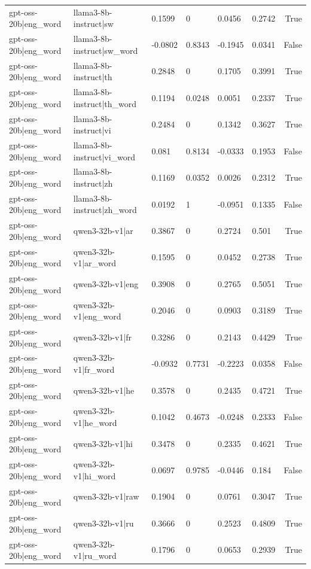 \begin{table}
\begin{tabular}{llllllr}
gpt-oss-20b|eng_word & llama3-8b-instruct|sw & 0.1599 & 0 & 0.0456 & 0.2742 & True \\
gpt-oss-20b|eng_word & llama3-8b-instruct|sw_word & -0.0802 & 0.8343 & -0.1945 & 0.0341 & False \\
gpt-oss-20b|eng_word & llama3-8b-instruct|th & 0.2848 & 0 & 0.1705 & 0.3991 & True \\
gpt-oss-20b|eng_word & llama3-8b-instruct|th_word & 0.1194 & 0.0248 & 0.0051 & 0.2337 & True \\
gpt-oss-20b|eng_word & llama3-8b-instruct|vi & 0.2484 & 0 & 0.1342 & 0.3627 & True \\
gpt-oss-20b|eng_word & llama3-8b-instruct|vi_word & 0.081 & 0.8134 & -0.0333 & 0.1953 & False \\
gpt-oss-20b|eng_word & llama3-8b-instruct|zh & 0.1169 & 0.0352 & 0.0026 & 0.2312 & True \\
gpt-oss-20b|eng_word & llama3-8b-instruct|zh_word & 0.0192 & 1 & -0.0951 & 0.1335 & False \\
gpt-oss-20b|eng_word & qwen3-32b-v1|ar & 0.3867 & 0 & 0.2724 & 0.501 & True \\
gpt-oss-20b|eng_word & qwen3-32b-v1|ar_word & 0.1595 & 0 & 0.0452 & 0.2738 & True \\
gpt-oss-20b|eng_word & qwen3-32b-v1|eng & 0.3908 & 0 & 0.2765 & 0.5051 & True \\
gpt-oss-20b|eng_word & qwen3-32b-v1|eng_word & 0.2046 & 0 & 0.0903 & 0.3189 & True \\
gpt-oss-20b|eng_word & qwen3-32b-v1|fr & 0.3286 & 0 & 0.2143 & 0.4429 & True \\
gpt-oss-20b|eng_word & qwen3-32b-v1|fr_word & -0.0932 & 0.7731 & -0.2223 & 0.0358 & False \\
gpt-oss-20b|eng_word & qwen3-32b-v1|he & 0.3578 & 0 & 0.2435 & 0.4721 & True \\
gpt-oss-20b|eng_word & qwen3-32b-v1|he_word & 0.1042 & 0.4673 & -0.0248 & 0.2333 & False \\
gpt-oss-20b|eng_word & qwen3-32b-v1|hi & 0.3478 & 0 & 0.2335 & 0.4621 & True \\
gpt-oss-20b|eng_word & qwen3-32b-v1|hi_word & 0.0697 & 0.9785 & -0.0446 & 0.184 & False \\
gpt-oss-20b|eng_word & qwen3-32b-v1|raw & 0.1904 & 0 & 0.0761 & 0.3047 & True \\
gpt-oss-20b|eng_word & qwen3-32b-v1|ru & 0.3666 & 0 & 0.2523 & 0.4809 & True \\
gpt-oss-20b|eng_word & qwen3-32b-v1|ru_word & 0.1796 & 0 & 0.0653 & 0.2939 & True \\

\end{tabular}
\end{table}

